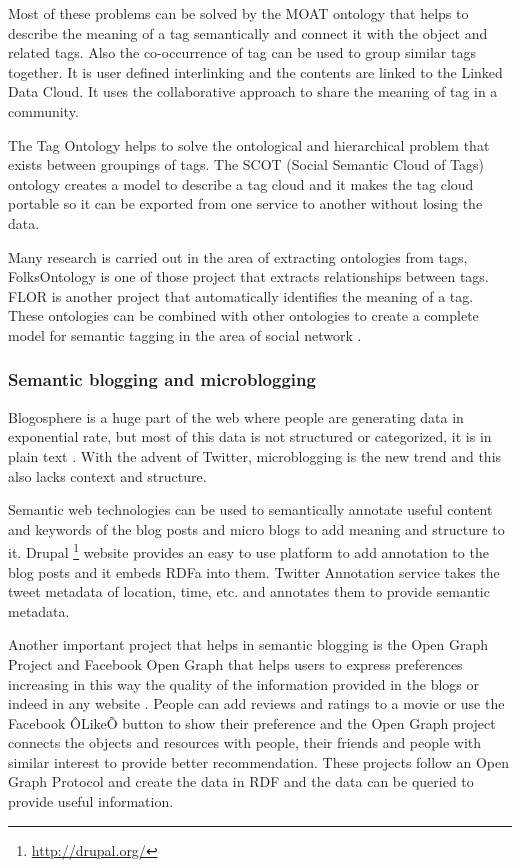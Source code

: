 Most of these problems can be solved by the MOAT ontology that helps to describe the meaning of a tag semantically and connect it with the object and related tags. Also the co-occurrence of tag can be used to group similar tags together. It is user defined interlinking and the contents are linked to the Linked Data Cloud. It uses the collaborative approach to share the meaning of tag in a community.

The Tag Ontology helps to solve the ontological and hierarchical problem that exists between groupings of tags. The SCOT (Social Semantic Cloud of Tags) ontology creates a model to describe a tag cloud and it makes the tag cloud portable so it can be exported from one service to another without losing the data.

Many research is carried out in the area of extracting ontologies from tags, FolksOntology is one of those project that extracts relationships between tags. FLOR is another project that automatically identifies the meaning of a tag. These ontologies can be combined with other ontologies to create a complete model for semantic tagging in the area of social network \cite{bojars2008interlinking}.

\subsubsection{Semantic blogging and microblogging}

Blogosphere is a huge part of the web where people are generating data in exponential rate, but most of this data is not structured or categorized, it is in plain text \cite{chin2006social}. With the advent of Twitter, microblogging is the new trend and this also lacks context and structure.

Semantic web technologies can be used to semantically annotate useful content and keywords of the blog posts and micro blogs to add meaning and structure to it. Drupal \footnote{\url{http://drupal.org/}} website provides an easy to use platform to add annotation to the blog posts and it embeds RDFa into them. Twitter Annotation service takes the tweet metadata of location, time, etc. and annotates them to provide semantic metadata.

Another important project that helps in semantic blogging is the Open Graph Project and Facebook Open Graph that helps users to express preferences increasing in this way the quality of the information provided in the blogs or indeed in any website \cite{rowe2009interlinking}. People can add reviews and ratings to a movie or use the Facebook ÔLikeÕ button to show their preference and the Open Graph project connects the objects and resources with people, their friends and people with similar interest to provide better recommendation. These projects follow an Open Graph Protocol and create the data in RDF and the data can be queried to provide useful information.

